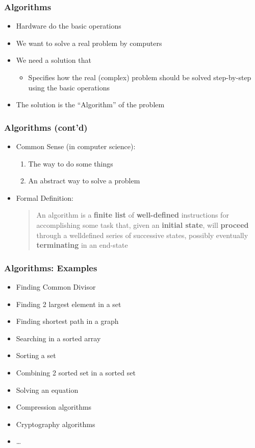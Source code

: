 \documentclass{../c-lecture}
\begin{document}
\begin{frame}
  \frametitle{Algorithms}
  \begin{itemize}
    \item Hardware do the basic operations
    \item We want to solve a real problem by computers
    \item We need a solution that
    \begin{itemize}
      \item Specifies how the real (complex) problem should be solved
        {\color{Orange} step-by-step} using the basic operations
    \end{itemize}
    \item The solution is the {\color{Green} ``Algorithm''} of the
      problem
  \end{itemize}
\end{frame}

\begin{frame}
  \frametitle{Algorithms (cont’d)}
  \begin{itemize}
    \item Common Sense (in computer science):
    \begin{enumerate}
      \item The way to do some things
      \item An abstract way to solve a problem
    \end{enumerate}
    \item Formal Definition:
    \begin{quote}
      An algorithm is a \textbf{\color{GreenYellow} finite list} of
      \textbf{\color{GreenYellow} well-defined} instructions for accomplishing
      some task that, given an \textbf{\color{GreenYellow} initial state}, will
      \textbf{\color{GreenYellow} proceed} through a welldefined series of
      successive states, possibly eventually
      \textbf{\color{GreenYellow} terminating} in an end-state
    \end{quote}
  \end{itemize}
\end{frame}

\begin{frame}
  \frametitle{Algorithms: Examples}
  \begin{itemize}
    \item Finding Common Divisor
    \item Finding 2 largest element in a set
    \item Finding shortest path in a graph
    \item Searching in a sorted array
    \item Sorting a set
    \item Combining 2 sorted set in a sorted set
    \item Solving an equation
    \item Compression algorithms
    \item Cryptography algorithms
    \item \ldots
  \end{itemize}
\end{frame}
\end{document}

